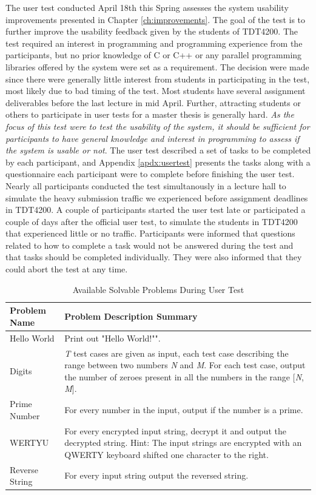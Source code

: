 The user test conducted April 18th this Spring assesses the system usability improvements presented in Chapter \ref{ch:improvements}. The goal of the test is to further improve the usability feedback given by the students of TDT4200. The test required an interest in programming and programming experience from the participants, but no prior knowledge of C or C++ or any parallel programming libraries offered by the system were set as a requirement. The decision were made since there were generally little interest from students in participating in the test, most likely due to bad timing of the test. Most students have several assignment deliverables before the last lecture in mid April. Further, attracting students or others to participate in user tests for a master thesis is generally hard. \textit{As the focus of this test were to test the usability of the system, it should be sufficient for participants to have general knowledge and interest in programming to assess if the system is usable or not}. The user test described a set of tasks to be completed by each participant, and Appendix \ref{apdx:usertest} presents the tasks along with a questionnaire each participant were to complete before finishing the user test. Nearly all participants conducted the test simultanously in a lecture hall to simulate the heavy submission traffic we experienced before assignment deadlines in TDT4200. A couple of participants started the user test late or participated a couple of days after the official user test, to simulate the students in TDT4200 that experienced little or no traffic. Participants were informed that questions related to how to complete a task would not be answered during the test and that tasks should be completed individually. They were also informed that they could abort the test at any time. \\

\begin{table}
    \centering
    \begin{tabular}{ | l | p{6cm} |}
    \hline
    \textbf{Problem Name} & \textbf{Problem Description Summary} \\ \hline
    Hello World & Print out "Hello World!"". \\ \hline
    Digits & \textit{T} test cases are given as input, each test case describing the range between two numbers \textit{N} and \textit{M}. For each test case, output the number of zeroes present in all the numbers in the range [\textit{N}, \textit{M}]. \\ \hline
    Prime Number & For every number in the input, output if the number is a prime. \\ \hline
    WERTYU & For every encrypted input string, decrypt it and output the decrypted string. Hint: The input strings are encrypted with an QWERTY keyboard shifted one character to the right. \\ \hline
    Reverse String & For every input string output the reversed string. \\
    \hline
    \end{tabular}
    \caption{Available Solvable Problems During User Test}
    \label{tab:avail-prob}
\end{table}

